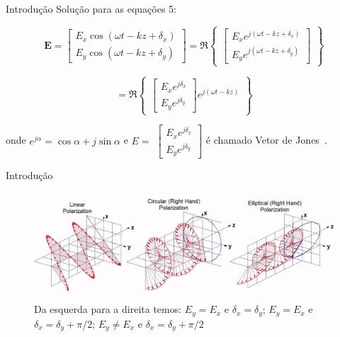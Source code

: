 \documentclass[10pt]{beamer}
\begin{document}
\begin{frame}{Introdução}
    Solução para as equações 5:
    
    \begin{displaymath}
       \mathbf{E} =
        \begin{bmatrix}
             E_x \cos(\omega t - kz + \delta_x)\\
             E_y \cos(\omega t - kz + \delta_y)
        \end{bmatrix}
        = \Re
        \begin{Bmatrix}
            \begin{bmatrix}
                 E_x e^{j(\omega t - kz + \delta_x)}\\
                 E_y e^{j(\omega t - kz + \delta_y)}
            \end{bmatrix}
        \end{Bmatrix}
    \end{displaymath}
    
    \begin{displaymath}
        = \Re
            \begin{Bmatrix}
                \begin{bmatrix}
                     E_x e^{j\delta_x}\\
                     E_y e^{j\delta_y}
                \end{bmatrix}
                e^{j(\omega t - kz)}
            \end{Bmatrix}
    \end{displaymath}
    
    \vspace{0.05\linewidth}
    
    onde $e^{j\alpha} = \cos \alpha + j\sin \alpha$ e $E =$ 
    $
    \begin{bmatrix}
         E_x e^{j\delta_x}\\
         E_y e^{j\delta_y}
    \end{bmatrix}
    $
    é chamado Vetor de Jones~\cite{Pottier09}.

\end{frame}

\begin{frame}{Introdução}
   
   \begin{figure}
           \centering
           \includegraphics[width = .9\linewidth]{eletro_wave.jpg}
           \caption{Da esquerda para a direita temos: $E_y = E_x$ e $\delta_x = \delta_y$; $E_y = E_x$ e $\delta_x = \delta_y + \pi/2$; $E_y \neq E_x$ e $\delta_x = \delta_y + \pi/2$ }
           \label{fig:eletro_wave}
    \end{figure}
    
\end{frame}
\end{document}
